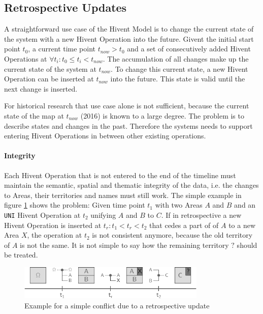 
\subsection{Retrospective Updates} %
\label{sub:retrospective_updates}

A straightforward use case of the Hivent Model is to change the current state of the system with a new Hivent Operation into the future. Givent the initial start point $t_0$, a current time point $t_{now} > t_0$ and a set of consecutively added Hivent Operations at $\forall t_i: t_0 \leq t_i < t_{now}$. The accumulation of all changes make up the current state of the system at $t_{now}$. To change this current state, a new Hivent Operation can be inserted at $t_{now}$ into the future. This state is valid until the next change is inserted.

For historical research that use case alone is not sufficient, because the current state of the map at $t_{now}$ (2016) is known to a large degree. The problem is to describe states and changes in the past. Therefore the systems needs to support entering Hivent Operations in between other existing operations.


\paragraph{Integrity} %
\label{par:integrity}

Each Hivent Operation that is not entered to the end of the timeline must maintain the semantic, spatial and thematic integrity of the data, i.e. the changes to Areas, their territories and names must still work. The simple example in figure \ref{fig:update_conflict_example} shows the problem: Given time point $t_1$ with two Areas $A$ and $B$ and an \texttt{UNI} Hivent Operation at $t_2$ unifying $A$ and $B$ to $C$. If in retrospective a new Hivent Operation is inserted at $t_r: t_1 < t_r < t_2$ that cedes a part of of $A$ to a new Area $X$, the operation at $t_2$ is not consistent anymore, because the old territory of $A$ is not the same. It is not simple to say how the remaining territory $?$ should be treated.

\begin{figure}[H]
  \vspace{1em}
  \centering
  \includegraphics[width=0.8\textwidth]{graphics/development/editing_hivent_data/retrospective_updates/example}
  \caption{Example for a simple conflict due to a retrospective update}
  \label{fig:update_conflict_example}
\end{figure}

